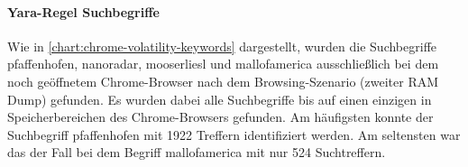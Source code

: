 \paragraph*{Yara-Regel \glqq{}Suchbegriffe\grqq{}}

Wie in \autoref{chart:chrome-volatility-keywords} dargestellt, wurden die Suchbegriffe \glqq{}pfaffenhofen\grqq{}, \glqq{}nanoradar\grqq{}, \glqq{}mooserliesl\grqq{} und \glqq{}mallofamerica\grqq{} ausschließlich bei dem noch geöffnetem Chrome-Browser nach dem Browsing-Szenario (zweiter RAM Dump) gefunden. Es wurden dabei alle Suchbegriffe bis auf einen einzigen in Speicherbereichen des Chrome-Browsers gefunden. Am häufigsten konnte der Suchbegriff \glqq{}pfaffenhofen\grqq{} mit 1922 Treffern identifiziert werden. Am seltensten war das der Fall bei dem Begriff \glqq{}mallofamerica\grqq{} mit \glqq{}nur\grqq{} 524 Suchtreffern.  

